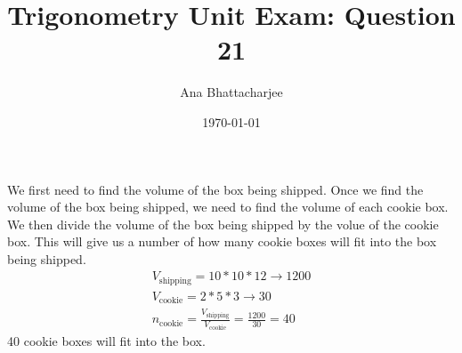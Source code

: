 \documentclass{article}
\begin{document}
\title{Trigonometry Unit Exam: Question 21}
\author{Ana Bhattacharjee}
\date{\today}
\maketitle

\begin{center}
  We first need to find the volume of the box being shipped. Once we find the volume of the box being shipped, we need to find the volume of each cookie box. We then divide the volume of the box being shipped by the volue of the cookie box. This will give us a number of how many cookie boxes will fit into the box being shipped.
  \begin{align}
    V_{\text{shipping}} = 10 * 10 * 12 \rightarrow 1200 \\
    V_{\text{cookie}} = 2 * 5 * 3 \rightarrow 30 \\
    n_{\text{cookie}} = \frac{V_{\text{shipping}}}{V_{\text{cookie}}} = \frac{1200}{30} = 40
  \end{align}
  40 cookie boxes will fit into the box. 
\end{center}
\end{document}
